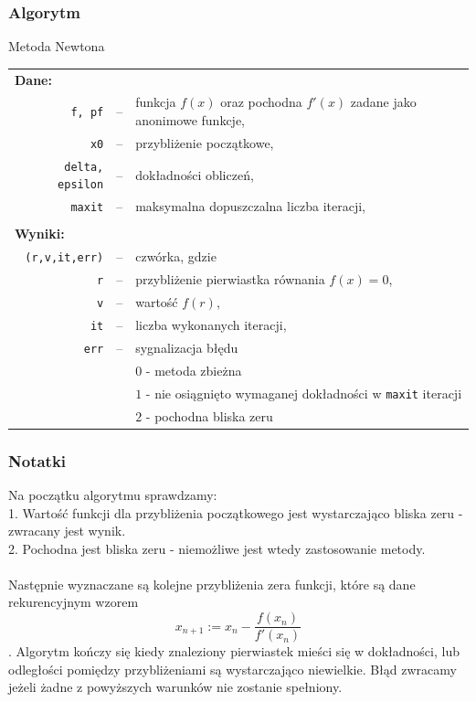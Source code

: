 \documentclass[10pt,a4paper, polish]{article}
\begin{document}
\subsubsection*{Algorytm}
\begin{algorithm}[H]
\caption{Metoda Newtona}
\label{alg:new}
\DontPrintSemicolon
{}
\end{algorithm} 
\begin{longtable}[l]{r  c  l}
\multicolumn{1}{l}{\textbf{Dane:}}&& \\
\texttt{f, pf}&--&funkcja $f(x)$ oraz pochodna $f'(x)$ zadane jako anonimowe funkcje, \\
\texttt{x0}&--&przybliżenie początkowe, \\
\texttt{delta, epsilon}&--&dokładności obliczeń, \\
\texttt{maxit}&--&maksymalna dopuszczalna liczba iteracji, \\
&& \\
\multicolumn{1}{l}{\textbf{Wyniki:}}&& \\
\texttt{(r,v,it,err)}&--&czwórka, gdzie \\
\texttt{r}&--&przybliżenie pierwiastka równania $f(x) = 0$, \\
\texttt{v}&--&wartość $f(r)$, \\
\texttt{it}&--&liczba wykonanych iteracji, \\
\texttt{err}&--&sygnalizacja błędu \\
&&$0$ - metoda zbieżna \\
&&$1$ - nie osiągnięto wymaganej dokładności w \texttt{maxit} iteracji \\
&&$2$ - pochodna bliska zeru \\
\end{longtable}

\subsubsection*{Notatki}
Na początku algorytmu sprawdzamy: \\
1. Wartość funkcji dla przybliżenia początkowego jest wystarczająco bliska zeru - zwracany jest wynik.\\
2. Pochodna jest bliska zeru - niemożliwe jest wtedy zastosowanie metody.\\\\ Następnie wyznaczane są kolejne przybliżenia zera funkcji, które są dane rekurencyjnym wzorem $$x_{n+1} := x_n - \dfrac{f(x_n)}{f'(x_n)}$$. Algorytm kończy się kiedy znaleziony pierwiastek mieści się w dokładności, lub odległości pomiędzy przybliżeniami są wystarczająco niewielkie. Błąd zwracamy jeżeli żadne z powyższych warunków nie zostanie spełniony.
\end{document}
